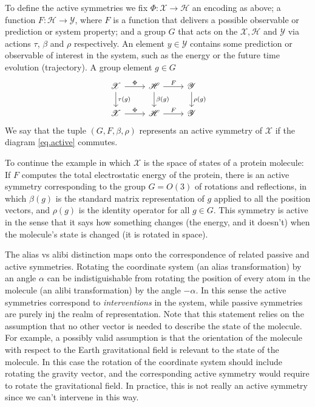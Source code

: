 \documentclass[preprint]{article} %
\renewcommand{\mathcal}[1]{\mathscr{#1}} %
\begin{document}
To define the active symmetries we fix $\Phi:\mathcal X \to \mathcal{H}$ an encoding as above; a function $F: \mathcal H \to \mathcal Y$, where $F$ is a function that delivers a possible observable or prediction or system property; and a group $G$ that acts on the $\mathcal X, \mathcal H$ and $\mathcal Y$ via actions $\tau$, $\beta$ and $\rho$ respectively.
An element $y\in\mathcal{Y}$ contains some prediction or observable of interest in the system, such as the energy or the future time evolution (trajectory).
A group element $g\in G$
\begin{equation}\label{eq.active}
\begin{tikzcd}[every label/.append]
  {\mathcal X}\arrow[r,"\Phi"] \arrow[d,"\tau(g)"] 
  & 
  {\mathcal H}  \arrow[d,"\beta(g)"] \arrow[r,"F"]
  & 
  {\mathcal Y}  \arrow[d,"\rho(g)"]
  \\
{\mathcal X} \arrow[r,"\Phi"]  
& 
{\mathcal H} \arrow[r,"F"]
&
{\mathcal Y} 
\end{tikzcd}
\end{equation}
We say that the tuple $(G, F, \beta, \rho)$ represents an active symmetry of $\mathcal X$ if the diagram \eqref{eq.active} commutes.

To continue the example in which $\mathcal{X}$ is the space of states of a protein molecule:
If $F$ computes the total electrostatic energy of the protein, there is an active symmetry corresponding to the group $G=O(3)$ of rotations and reflections, in which $\beta(g)$ is the standard matrix representation of $g$ applied to all the position vectors, and $\rho(g)$ is the identity operator for all $g\in G$.
This symmetry is active in the sense that it says how something changes (the energy, and it doesn't) when the molecule's state is changed (it is rotated in space).

The alias vs alibi distinction maps onto the correspondence of related passive and active symmetries.
Rotating the coordinate system (an alias transformation) by an angle $\alpha$ can be indistiguishable from rotating the position of every atom in the molecule (an alibi transformation) by the angle $-\alpha$. 
In this sense the active symmetries correspond to \emph{interventions} in the system, while passive symmetries are purely inj the realm of representation.
Note that this statement relies on the assumption that no other vector is needed to describe the state of the molecule. 
For example, a possibly valid assumption is that the orientation of the molecule with respect to the Earth gravitational field is relevant to the state of the molecule. 
In this case the rotation of the coordinate system should include rotating the gravity vector, and the corresponding active symmetry would require to rotate the gravitational field. In practice, this is not really an active symmetry since we can't intervene in this way.
\end{document}

